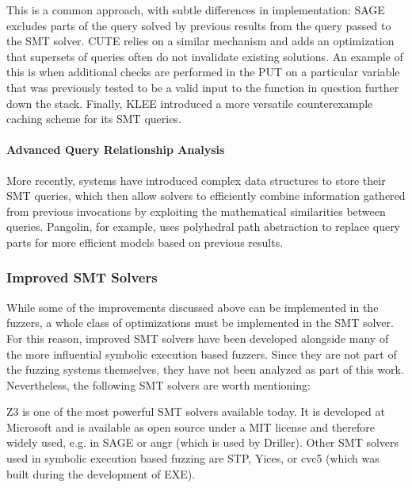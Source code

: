 \documentclass{article}
\begin{document}
\begin{multicols}{2}
    This is a common approach, with subtle differences in implementation: SAGE\cite{SAGE} excludes parts of the query solved by previous results from the query passed to the SMT solver. CUTE\cite{CUTE} relies on a similar mechanism and adds an optimization that supersets of queries often do not invalidate existing solutions. An example of this is when additional checks are performed in the PUT on a particular variable that was previously tested to be a valid input to the function in question further down the stack. Finally, KLEE\cite{KLEE} introduced a more versatile counterexample caching scheme for its SMT queries.

    \paragraph{Advanced Query Relationship Analysis}
    More recently, systems have introduced complex data structures to store their SMT queries, which then allow solvers to efficiently combine information gathered from previous invocations by exploiting the mathematical similarities between queries. Pangolin\cite{Pangolin}, for example, uses polyhedral path abstraction to replace query parts for more efficient models based on previous results.

    \subsubsection{Improved SMT Solvers}
    While some of the improvements discussed above can be implemented in the fuzzers, a whole class of optimizations must be implemented in the SMT solver. For this reason, improved SMT solvers have been developed alongside many of the more influential symbolic execution based fuzzers. Since they are not part of the fuzzing systems themselves, they have not been analyzed as part of this work. Nevertheless, the following SMT solvers are worth mentioning:

    Z3\cite{Z3} is one of the most powerful SMT solvers available today. It is developed at Microsoft and is available as open source under a MIT license and therefore widely used, e.g. in SAGE\cite{SAGE} or angr\cite{angr} (which is used by Driller\cite{Driller}). Other SMT solvers used in symbolic execution based fuzzing are STP\cite{STP}, Yices\cite{Yices}, or cvc5\cite{CVC5} (which was built during the development of EXE\cite{EXE}).


\end{multicols}
\end{document}
